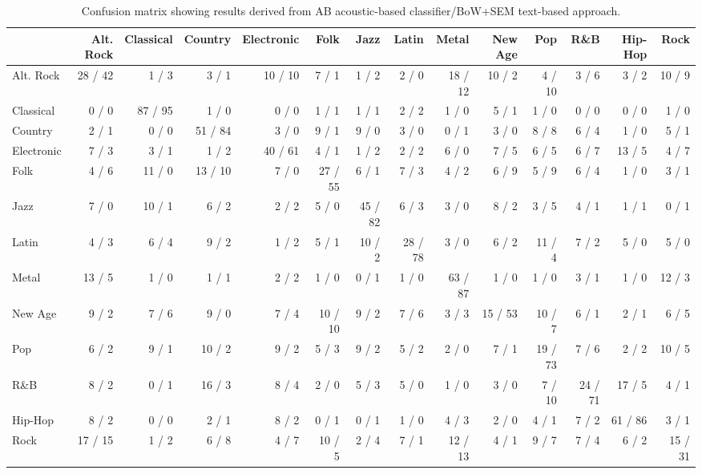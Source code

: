\begin{table}[]
\centering
\scriptsize
\begin{tabular}{|l|r|r|r|r|r|r|r|r|r|r|r|r|r|}
\hline
& Alt. Rock & Classical & Country & Electronic & Folk & Jazz & Latin & Metal & New Age & Pop & R\&B & Hip-Hop & Rock  \\
\hline
Alt. Rock & 28 / 42 & 1 / 3 & 3 / 1 & 10 / 10 & 7 / 1 & 1 / 2 & 2 / 0 & 18 / 12 & 10 / 2 & 4 / 10 & 3 / 6 & 3 / 2 & 10 / 9 \\
Classical & 0 / 0 & 87 / 95 & 1 / 0 & 0 / 0 & 1 / 1 & 1 / 1 & 2 / 2 & 1 / 0 & 5 / 1 & 1 / 0 & 0 / 0 & 0 / 0 & 1 / 0 \\
Country & 2 / 1 & 0 / 0 & 51 / 84 & 3 / 0 & 9 / 1 & 9 / 0 & 3 / 0 & 0 / 1 & 3 / 0 & 8 / 8 & 6 / 4 & 1 / 0 & 5 / 1 \\
Electronic & 7 / 3 & 3 / 1 & 1 / 2 & 40 / 61 & 4 / 1 & 1 / 2 & 2 / 2 & 6 / 0 & 7 / 5 & 6 / 5 & 6 / 7 & 13 / 5 & 4 / 7 \\
Folk & 4 / 6 & 11 / 0 & 13 / 10 & 7 / 0 & 27 / 55 & 6 / 1 & 7 / 3 & 4 / 2 & 6 / 9 & 5 / 9 & 6 / 4 & 1 / 0 & 3 / 1 \\
Jazz & 7 / 0 & 10 / 1 & 6 / 2 & 2 / 2 & 5 / 0 & 45 / 82 & 6 / 3 & 3 / 0 & 8 / 2 & 3 / 5 & 4 / 1 & 1 / 1 & 0 / 1 \\
Latin & 4 / 3 & 6 / 4 & 9 / 2 & 1 / 2 & 5 / 1 & 10 / 2 & 28 / 78 & 3 / 0 & 6 / 2 & 11 / 4 & 7 / 2 & 5 / 0 & 5 / 0 \\
Metal & 13 / 5 & 1 / 0 & 1 / 1 & 2 / 2 & 1 / 0 & 0 / 1 & 1 / 0 & 63 / 87 & 1 / 0 & 1 / 0 & 3 / 1 & 1 / 0 & 12 / 3 \\
New Age & 9 / 2 & 7 / 6 & 9 / 0 & 7 / 4 & 10 / 10 & 9 / 2 & 7 / 6 & 3 / 3 & 15 / 53 & 10 / 7 & 6 / 1 & 2 / 1 & 6 / 5 \\
Pop & 6 / 2 & 9 / 1 & 10 / 2 & 9 / 2 & 5 / 3 & 9 / 2 & 5 / 2 & 2 / 0 & 7 / 1 & 19 / 73 & 7 / 6 & 2 / 2 & 10 / 5 \\
R\&B & 8 / 2 & 0 / 1 & 16 / 3 & 8 / 4 & 2 / 0 & 5 / 3 & 5 / 0 & 1 / 0 & 3 / 0 & 7 / 10 & 24 / 71 & 17 / 5 & 4 / 1 \\
Hip-Hop & 8 / 2 & 0 / 0 & 2 / 1 & 8 / 2 & 0 / 1 & 0 / 1 & 1 / 0 & 4 / 3 & 2 / 0 & 4 / 1 & 7 / 2 & 61 / 86 & 3 / 1 \\
Rock & 17 / 15 & 1 / 2 & 6 / 8 & 4 / 7 & 10 / 5 & 2 / 4 & 7 / 1 & 12 / 13 & 4 / 1 & 9 / 7 & 7 / 4 & 6 / 2 & 15 / 31 \\
\hline
\end{tabular}
\caption{Confusion matrix showing results derived from AB acoustic-based classifier/BoW+SEM text-based approach.}
\label{tbl:confusion}
\end{table}


